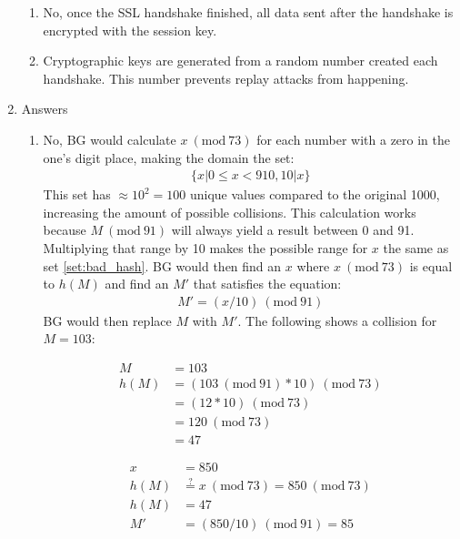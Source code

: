 \documentclass{article}
\newcommand{\Mod}[1]{\ (\mathrm{mod}\ #1)}
\begin{document}
\begin{enumerate}
\begin{enumerate}
        \item No, once the SSL handshake finished, all data sent after the handshake is encrypted with the session key.

        \item Cryptographic keys are generated from a random number created each handshake. This number prevents replay attacks from happening.
        
    \end{enumerate}

    \item Answers
    \begin{enumerate}
        
        \item No, BG would calculate $x \Mod{73}$ for each number with a zero in the one's digit place, making the domain the set:
        \begin{align}\label{set:bad_hash}
            \{x | 0 \leq x < 910, 10 | x\}
        \end{align} 
        This set has $\approx 10^2 = 100$ unique values compared to the original 1000, increasing the amount of possible collisions. This calculation works because $M \Mod{91}$ will always yield a result between 0 and 91. Multiplying that range by 10 makes the possible range for $x$ the same as set \ref{set:bad_hash}. BG would then find an $x$ where $x \Mod{73}$ is equal to $h(M)$ and find an $M'$ that satisfies the equation:
        \begin{align*}
            M' = (x / 10) \Mod{91}
        \end{align*} 
        BG would then replace $M$ with $M'$. 
        The following shows a collision for $M = 103$:
        
        \begin{align*}
            M &= 103\\
            h(M) &= (103 \Mod{91} * 10) \Mod{73}\\
            &= (12 * 10) \Mod{73}\\
            &= 120 \Mod{73}\\
            &= 47
        \end{align*}
        
        \begin{align*}
            x &= 850 \\
            h(M) &\stackrel{?}{=} x \Mod{73} = 850 \Mod{73}\\
            h(M) &= 47 \\
            M' &= (850 / 10) \Mod{91} = 85
        \end{align*}

    \end{enumerate}
\end{enumerate}    
\end{document}
